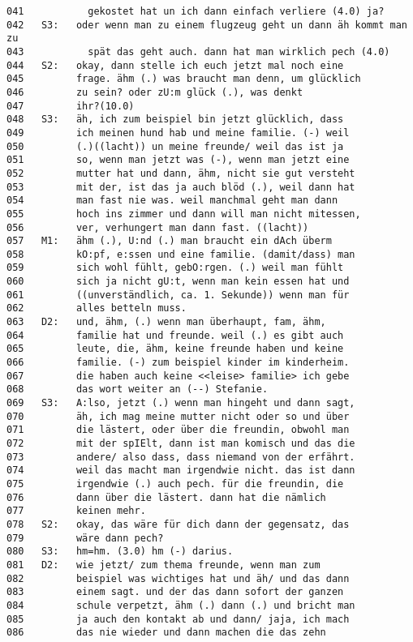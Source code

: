 \begin{lstlisting}[language={}]
041           gekostet hat un ich dann einfach verliere (4.0) ja? 
042   S3:   oder wenn man zu einem flugzeug geht un dann äh kommt man zu 
043           spät das geht auch. dann hat man wirklich pech (4.0)
044   S2:   okay, dann stelle ich euch jetzt mal noch eine
045         frage. ähm (.) was braucht man denn, um glücklich 
046         zu sein? oder zU:m glück (.), was denkt 
047         ihr?(10.0)
048   S3:   äh, ich zum beispiel bin jetzt glücklich, dass 
049         ich meinen hund hab und meine familie. (-) weil 
050         (.)((lacht)) un meine freunde/ weil das ist ja 
051         so, wenn man jetzt was (-), wenn man jetzt eine 
052         mutter hat und dann, ähm, nicht sie gut versteht 
053         mit der, ist das ja auch blöd (.), weil dann hat
054         man fast nie was. weil manchmal geht man dann 
055         hoch ins zimmer und dann will man nicht mitessen, 
056         ver, verhungert man dann fast. ((lacht))
057   M1:   ähm (.), U:nd (.) man braucht ein dAch überm 
058         kO:pf, e:ssen und eine familie. (damit/dass) man 
059         sich wohl fühlt, gebO:rgen. (.) weil man fühlt 
060         sich ja nicht gU:t, wenn man kein essen hat und 
061         ((unverständlich, ca. 1. Sekunde)) wenn man für
062         alles betteln muss.
063   D2:   und, ähm, (.) wenn man überhaupt, fam, ähm,
064         familie hat und freunde. weil (.) es gibt auch 
065         leute, die, ähm, keine freunde haben und keine 
066         familie. (-) zum beispiel kinder im kinderheim.
067         die haben auch keine <<leise> familie> ich gebe
068         das wort weiter an (--) Stefanie.
069   S3:   A:lso, jetzt (.) wenn man hingeht und dann sagt,
070         äh, ich mag meine mutter nicht oder so und über 
071         die lästert, oder über die freundin, obwohl man 
072         mit der spIElt, dann ist man komisch und das die 
073         andere/ also dass, dass niemand von der erfährt. 
074         weil das macht man irgendwie nicht. das ist dann
075         irgendwie (.) auch pech. für die freundin, die 
076         dann über die lästert. dann hat die nämlich
077         keinen mehr.
078   S2:   okay, das wäre für dich dann der gegensatz, das 
079         wäre dann pech?
080   S3:   hm=hm. (3.0) hm (-) darius.
081   D2:   wie jetzt/ zum thema freunde, wenn man zum 
082         beispiel was wichtiges hat und äh/ und das dann 
083         einem sagt. und der das dann sofort der ganzen 
084         schule verpetzt, ähm (.) dann (.) und bricht man
085         ja auch den kontakt ab und dann/ jaja, ich mach
086         das nie wieder und dann machen die das zehn 

\end{lstlisting}
